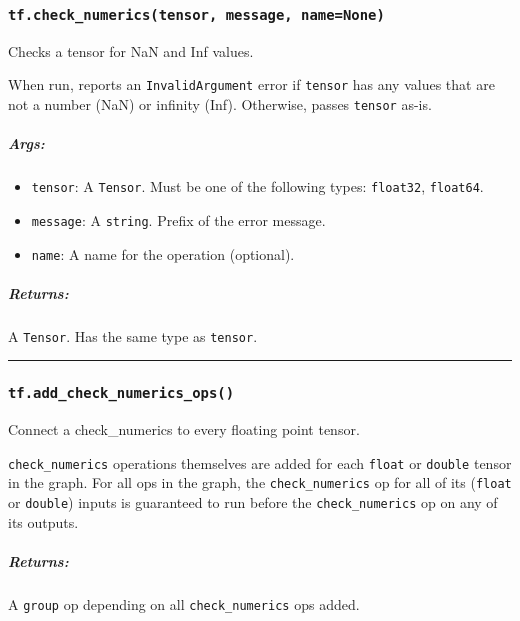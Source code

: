 \subsubsection{\texorpdfstring{\texttt{tf.check\_numerics(tensor,\ message,\ name=None)}
}{tf.check\_numerics(tensor, message, name=None) }}\label{tf.checkux5fnumericstensor-message-namenone}

Checks a tensor for NaN and Inf values.

When run, reports an \texttt{InvalidArgument} error if \texttt{tensor}
has any values that are not a number (NaN) or infinity (Inf). Otherwise,
passes \texttt{tensor} as-is.

\subparagraph{Args: }\label{args-20}

\begin{itemize}
\tightlist
\item
  \texttt{tensor}: A \texttt{Tensor}. Must be one of the following
  types: \texttt{float32}, \texttt{float64}.
\item
  \texttt{message}: A \texttt{string}. Prefix of the error message.
\item
  \texttt{name}: A name for the operation (optional).
\end{itemize}

\subparagraph{Returns: }\label{returns-20}

A \texttt{Tensor}. Has the same type as \texttt{tensor}.

\begin{center}\rule{0.5\linewidth}{\linethickness}\end{center}

\subsubsection{\texorpdfstring{\texttt{tf.add\_check\_numerics\_ops()}
}{tf.add\_check\_numerics\_ops() }}\label{tf.addux5fcheckux5fnumericsux5fops}

Connect a check\_numerics to every floating point tensor.

\texttt{check\_numerics} operations themselves are added for each
\texttt{float} or \texttt{double} tensor in the graph. For all ops in
the graph, the \texttt{check\_numerics} op for all of its
(\texttt{float} or \texttt{double}) inputs is guaranteed to run before
the \texttt{check\_numerics} op on any of its outputs.

\subparagraph{Returns: }\label{returns-21}

A \texttt{group} op depending on all \texttt{check\_numerics} ops added.

